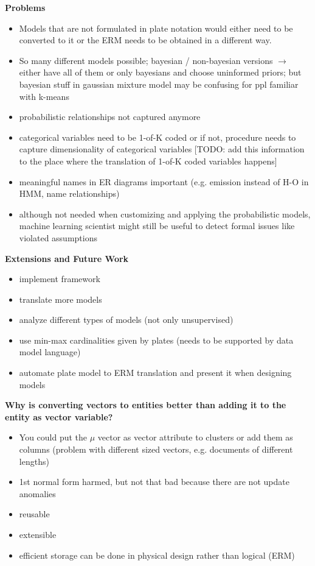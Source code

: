\textbf{Problems}
\begin{itemize}
\item Models that are not formulated in plate notation would either need to be converted to it or the ERM needs to be obtained in a different way.
\item So many different models possible; bayesian / non-bayesian versions $\rightarrow$ either have all of them or only bayesians and choose uninformed priors; but bayesian stuff in gaussian mixture model may be confusing for ppl familiar with k-means
\item probabilistic relationships not captured anymore
\item categorical variables need to be 1-of-K coded or if not, procedure needs to capture dimensionality of categorical variables [TODO: add this information to the place where the translation of 1-of-K coded variables happens]
\item meaningful names in ER diagrams important (e.g. emission instead of H-O in HMM, name relationships)
\item although not needed when customizing and applying the probabilistic models, machine learning scientist might still be useful to detect formal issues like violated assumptions
\end{itemize}

\textbf{Extensions and Future Work}
\begin{itemize}
\item implement framework
\item translate more models
\item analyze different types of models (not only unsupervised)
\item use min-max cardinalities given by plates (needs to be supported by data model language)
\item automate plate model to ERM translation and present it when designing models
\end{itemize}

\textbf{Why is converting vectors to entities better than adding it to the entity as vector variable?}
\begin{itemize}
\item You could put the $\mu$ vector as vector attribute to clusters or add them as columns (problem with different sized vectors, e.g. documents of different lengths)
\item 1st normal form harmed, but not that bad because there are not update anomalies
\item reusable
\item extensible
\item efficient storage can be done in physical design rather than logical (ERM)
\end{itemize}

